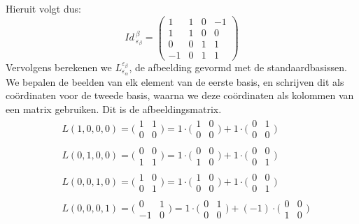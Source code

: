 \documentclass[lineaire_algebra_oplossingen.tex]{subfiles}
\begin{document}
Hieruit volgt dus:
\[
\textit{Id}\,^\beta_{\varepsilon_\beta} = 
\begin{pmatrix}
 1 & 1 & 0 & -1 \\
 1 & 1 & 0 &  0 \\
 0 & 0 & 1 &  1 \\
-1 & 0 & 1 &  1
\end{pmatrix}
\]
Vervolgens berekenen we $L^{\varepsilon_\beta}_{\varepsilon_\alpha}$, de afbeelding gevormd met de standaardbasissen. We bepalen de beelden van elk element van de eerste basis, en schrijven dit als co\"ordinaten voor de tweede basis, waarna we deze co\"ordinaten als kolommen van een matrix gebruiken. Dit is de afbeeldingsmatrix.
\begin{align*}
& L(1,0,0,0)=\bigl(\begin{smallmatrix} 1&1\\ 0&0 \end{smallmatrix} \bigr) = 1\cdot\bigl(\begin{smallmatrix} 1&0\\ 0&0 \end{smallmatrix} \bigr) + 1\cdot\bigl(\begin{smallmatrix} 0&1\\ 0&0 \end{smallmatrix} \bigr) \\
& L(0,1,0,0)=\bigl(\begin{smallmatrix}0&0\\ 1&1 \end{smallmatrix} \bigr) = 1\cdot\bigl(\begin{smallmatrix} 0&0\\ 1&0 \end{smallmatrix} \bigr) + 1\cdot\bigl(\begin{smallmatrix} 0&0\\ 0&1 \end{smallmatrix} \bigr) \\
& L(0,0,1,0)=\bigl(\begin{smallmatrix} 1&0\\ 0&1 \end{smallmatrix} \bigr) = 1\cdot\bigl(\begin{smallmatrix} 1&0\\ 0&0 \end{smallmatrix} \bigr) + 1\cdot\bigl(\begin{smallmatrix} 0&0\\ 0&1 \end{smallmatrix} \bigr) \\
& L(0,0,0,1)=\bigl(\begin{smallmatrix} 0&1\\ -1&0 \end{smallmatrix} \bigr) = 1\cdot\bigl(\begin{smallmatrix} 0&1\\ 0&0 \end{smallmatrix} \bigr) + (-1)\cdot\bigl(\begin{smallmatrix} 0&0\\ 1&0 \end{smallmatrix} \bigr)
\end{align*}
\end{document}
